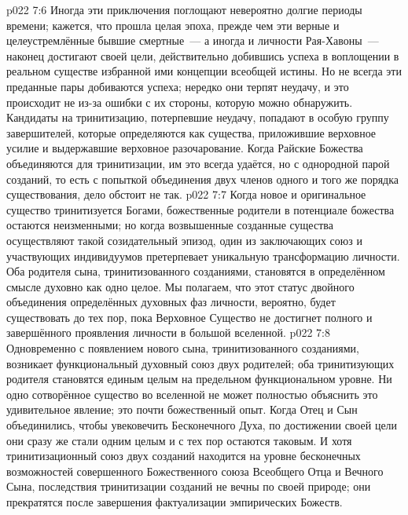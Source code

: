 \vs p022 7:6 Иногда эти приключения поглощают невероятно долгие периоды времени; кажется, что прошла целая эпоха, прежде чем эти верные и целеустремлённые бывшие смертные~--- а иногда и личности Рая\hyp{}Хавоны~--- наконец достигают своей цели, действительно добившись успеха в воплощении в реальном существе избранной ими концепции всеобщей истины. Но не всегда эти преданные пары добиваются успеха; нередко они терпят неудачу, и это происходит не из-за ошибки с их стороны, которую можно обнаружить. Кандидаты на тринитизацию, потерпевшие неудачу, попадают в особую группу завершителей, которые определяются как существа, приложившие верховное усилие и выдержавшие верховное разочарование. Когда Райские Божества объединяются для тринитизации, им это всегда удаётся, но с однородной парой созданий, то есть с попыткой объединения двух членов одного и того же порядка существования, дело обстоит не так.
\vs p022 7:7 \pc Когда новое и оригинальное существо тринитизуется Богами, божественные родители в потенциале божества остаются неизменными; но когда возвышенные созданные существа осуществляют такой созидательный эпизод, один из заключающих союз и участвующих индивидуумов претерпевает уникальную трансформацию личности. Оба родителя сына, тринитизованного созданиями, становятся в определённом смысле духовно как одно целое. Мы полагаем, что этот статус двойного объединения определённых духовных фаз личности, вероятно, будет существовать до тех пор, пока Верховное Существо не достигнет полного и завершённого проявления личности в большой вселенной.
\vs p022 7:8 Одновременно с появлением нового сына, тринитизованного созданиями, возникает функциональный духовный союз двух родителей; оба тринитизующих родителя становятся единым целым на предельном функциональном уровне. Ни одно сотворённое существо во вселенной не может полностью объяснить это удивительное явление; это почти божественный опыт. Когда Отец и Сын объединились, чтобы увековечить Бесконечного Духа, по достижении своей цели они сразу же стали одним целым и с тех пор остаются таковым. И хотя тринитизационный союз двух созданий находится на уровне бесконечных возможностей совершенного Божественного союза Всеобщего Отца и Вечного Сына, последствия тринитизации созданий не вечны по своей природе; они прекратятся после завершения фактуализации эмпирических Божеств.
